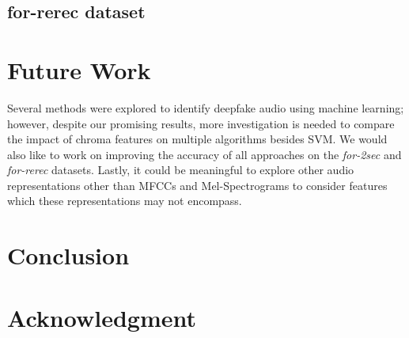 \documentclass[conference]{IEEEtran}
\begin{document}
\subsection{for-rerec dataset}

\section{Future Work}
Several methods were explored to identify deepfake audio using machine learning; however, despite our promising results, more investigation is needed to compare the impact of chroma features on multiple algorithms besides SVM. We would also like to work on improving the accuracy of all approaches on the \textit{for-2sec} and \textit{for-rerec} datasets. Lastly, it could be meaningful to explore other audio representations other than MFCCs and Mel-Spectrograms to consider features which these representations may not encompass. 

\section{Conclusion}

\section*{Acknowledgment}


\end{document}
